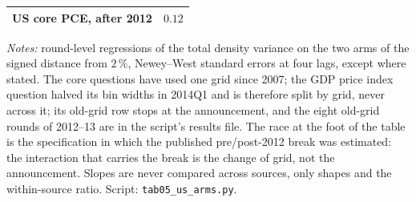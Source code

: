 \begin{table}[tbp]
\begin{tabular}{lccccc}
\multicolumn{4}{l}{US core PCE, after 2012} & \multicolumn{2}{c}{$0.12$} \\
\bottomrule
\end{tabular}
\vspace{0.3em}
\parbox{0.95\linewidth}{\footnotesize \textit{Notes:} round-level regressions of the total
density variance on the two arms of the signed distance from $2\,\%$, Newey--West standard
errors at four lags, except where stated. The core questions have used one grid since 2007;
the GDP price index question halved its bin widths in 2014Q1 and is therefore split by grid,
never across it; its old-grid row stops at the announcement, and the eight old-grid rounds of
2012--13 are in the script's results file. The race at the foot of the table is the specification in which the published
pre/post-2012 break was estimated: the interaction that carries the break is the change of
grid, not the announcement. Slopes are never compared across sources, only shapes and the
within-source ratio. Script: \texttt{tab05\_us\_arms.py}.}
\end{table}
